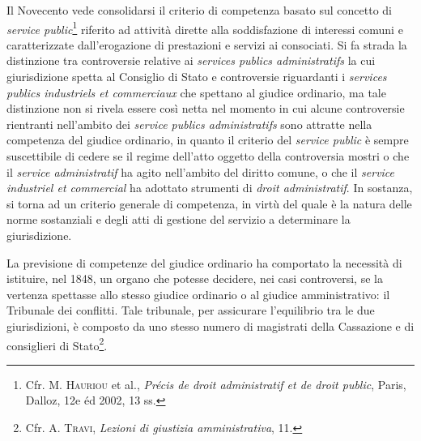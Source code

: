 \documentclass[12pt,it,a4paper,]{report}
\begin{document}
Il Novecento vede consolidarsi il criterio di competenza basato sul
concetto di \emph{service public}\footnote{Cfr. M. \textsc{Hauriou} et
  al., \emph{Précis de droit administratif et de droit public}, Paris,
  Dalloz, 12e éd 2002, 13 ss.} riferito ad attività dirette alla
soddisfazione di interessi comuni e caratterizzate dall'erogazione di
prestazioni e servizi ai consociati. Si fa strada la distinzione tra
controversie relative ai \emph{services publics administratifs} la cui
giurisdizione spetta al Consiglio di Stato e controversie riguardanti i
\emph{services publics industriels et commerciaux} che spettano al
giudice ordinario, ma tale distinzione non si rivela essere così netta
nel momento in cui alcune controversie rientranti nell'ambito dei
\emph{service publics administratifs} sono attratte nella competenza del
giudice ordinario, in quanto il criterio del \emph{service public} è
sempre suscettibile di cedere se il regime dell'atto oggetto della
controversia mostri o che il \emph{service administratif} ha agito
nell'ambito del diritto comune, o che il \emph{service industriel et
commercial} ha adottato strumenti di \emph{droit administratif}. In
sostanza, si torna ad un criterio generale di competenza, in virtù del
quale è la natura delle norme sostanziali e degli atti di gestione del
servizio a determinare la giurisdizione.

La previsione di competenze del giudice ordinario ha comportato la
necessità di istituire, nel 1848, un organo che potesse decidere, nei
casi controversi, se la vertenza spettasse allo stesso giudice ordinario
o al giudice amministrativo: il Tribunale dei conflitti. Tale tribunale,
per assicurare l'equilibrio tra le due giurisdizioni, è composto da uno
stesso numero di magistrati della Cassazione e di consiglieri di
Stato\footnote{Cfr. A. \textsc{Travi}, \emph{Lezioni di giustizia
  amministrativa}, 11.}.
\end{document}
